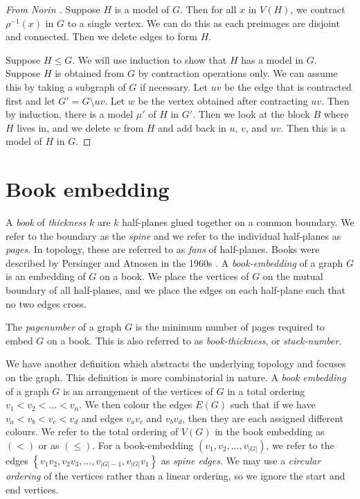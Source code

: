 \begin{proof}[From Norin \cite{norinMath599GraphMinors2017}]
	Suppose $H$ is a model of $G$. Then for all $x$ in $V(H)$, we contract $\rho^{-1}(x)$ in $G$ to a single vertex. We can do this as each preimages are disjoint and connected. Then we delete edges to form $H$. 
	
	Suppose $H \leq G$. We will use induction to show that $H$ has a model in $G$. Suppose $H$ is obtained from $G$ by contraction operations only. We can assume this by taking a subgraph of $G$ if necessary. Let $uv$ be the edge that is contracted first and let $G' = G \setminus uv$. Let $w$ be the vertex obtained after contracting $uv$. Then by induction, there is a model $\mu'$ of $H$ in $G'$. Then we look at the block $B$ where $H$ lives in, and we delete $w$ from $H$ and add back in $u$, $v$, and $uv$. Then this is a model of $H$ in $G$. 
\end{proof}
\section{Book embedding}\label{sec:Book Embedding}
A \textit{book} of \textit{thickness} $k$ are $k$ half-planes glued together on a common boundary. We refer to the boundary as the \textit{spine} and we refer to the individual half-planes as \textit{pages}. In topology, these are referred to as \textit{fans} of half-planes. Books were described by Persinger and Atnosen in the 1960s \cite{persingerSubsetsNbooksE31966, atneosenOnedimensionalNleavedContinua1972}. 
A \textit{book-embedding} of a graph $G$ is an embedding of $G$ on a book. We place the vertices of $G$ on the mutual boundary of all half-planes, and we place the edges on each half-plane such that no two edges cross.

The \textit{pagenumber} of a graph $G$ is the minimum number of pages required to embed $G$ on a book. This is also referred to as \textit{book-thickness}, or \textit{stack-number}. 

We have another definition which abstracts the underlying topology and focuses on the graph. This definition is more combinatorial in nature. 
A \textit{book embedding} of a graph $G$ is an arrangement of the vertices of $G$ in a total ordering $v_1 < v_2 < ... < v_n$. We then colour the edges $E(G)$ such that if we have $v_a < v_b < v_c < v_d$ and edges $v_a v_c$ and $v_b v_d$, then they are each assigned different colours.
We refer to the total ordering of $V(G)$ in the book embedding as $(<)$ or as $(\leq)$. For a book-embedding $(v_1, v_2, ..., v_{|G|})$, we refer to the edges $\left\{v_1 v_2, v_2 v_3, ..., v_{|G| - 1}, v_{|G|}v_{1}\right\}$ as \textit{spine edges}.
We may use a \textit{circular ordering} of the vertices rather than a linear ordering, so we ignore the start and end vertices.

